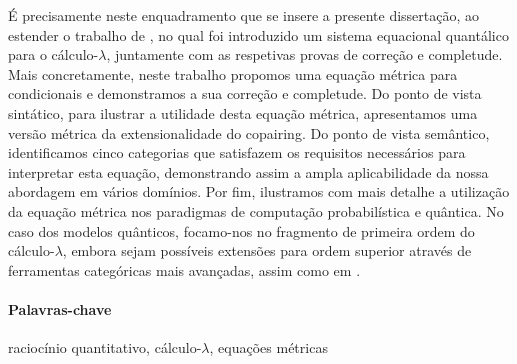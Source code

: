 É precisamente neste enquadramento que se insere a presente dissertação, ao estender o trabalho de \cite{dahlqvist2023syntactic}, no qual foi introduzido um sistema equacional quantálico para o cálculo-$\lambda$, juntamente com as respetivas provas de correção e completude. Mais concretamente, neste trabalho propomos uma equação métrica para condicionais e demonstramos a sua correção e completude.
Do ponto de vista sintático, para ilustrar a utilidade desta equação métrica, apresentamos uma versão métrica da extensionalidade do copairing.  Do ponto de vista semântico, identificamos cinco categorias que satisfazem os requisitos necessários para interpretar esta equação, demonstrando assim a ampla aplicabilidade da nossa abordagem em vários domínios. Por fim, ilustramos com mais detalhe a utilização da equação métrica nos paradigmas de computação probabilística e quântica. No caso dos modelos quânticos, focamo-nos no fragmento de primeira ordem do cálculo-$\lambda$, embora sejam possíveis extensões para ordem superior através de ferramentas categóricas mais avançadas, assim como em \cite{dahlqvist2023syntactic}.






\paragraph{Palavras-chave} raciocínio quantitativo, cálculo-$\lambda$, equações métricas


\cleardoublepage
